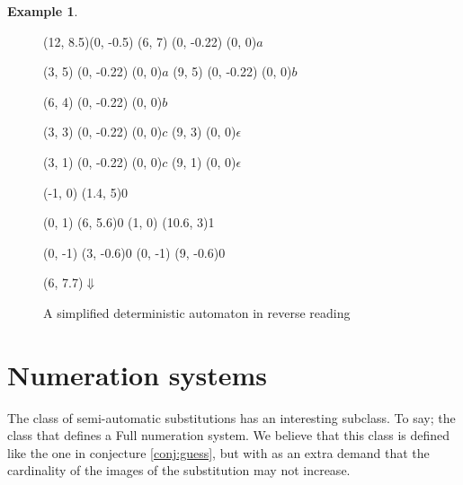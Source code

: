 \documentclass{article}
\theoremstyle{definition}
\newtheorem{example}[theorem]{Example}
\begin{document}
\begin{example}
\begin{itemize}
\begin{figure}[p]
\begin{graph}(12, 8.5)(0, -0.5)
  (6, 7)
    (0, -0.22){} (0, 0){$a$}

  (3, 5)
    (0, -0.22){} (0, 0){$a$}
  (9, 5)
    (0, -0.22){} (0, 0){$b$}

  (6, 4)
    (0, -0.22){} (0, 0){$b$}

  (3, 3)
    (0, -0.22){} (0, 0){$c$}
  (9, 3) (0, 0){$\epsilon$}

  (3, 1)
    (0, -0.22){} (0, 0){$c$}
  (9, 1) (0, 0){$\epsilon$}

   
   

  (-1, 0) \freetext(1.4, 5){0}
   
   
   

   
   
  (0, 1) \freetext(6, 5.6){0}
   
   
  (1, 0) \freetext(10.6, 3){1}

  
  (0, -1) \freetext(3, -0.6){0}
   
  (0, -1) \freetext(9, -0.6){0}
   

  \freetext(6, 7.7){$\Downarrow$}
\end{graph}
\caption{A simplified deterministic automaton in reverse reading}
\label{fig:simpl_det_reverse}
\end{figure}
\end{itemize}
\end{example}

\section{Numeration systems}
The class of semi-automatic substitutions has an interesting subclass. To say;
the class that defines a Full numeration system. We believe that this class
is defined like the one in conjecture \ref{conj:guess}, but with as an extra
demand that the cardinality of the images of the substitution may not increase.
\end{document}
